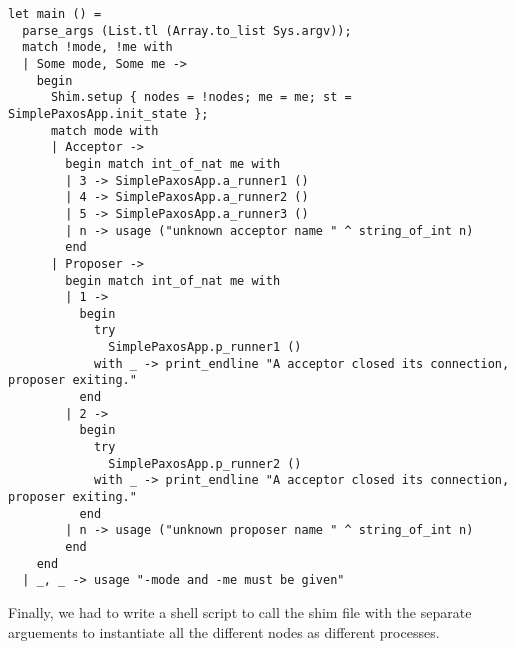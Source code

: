 \begin{lstlisting}
let main () =
  parse_args (List.tl (Array.to_list Sys.argv));
  match !mode, !me with
  | Some mode, Some me ->
    begin
      Shim.setup { nodes = !nodes; me = me; st = SimplePaxosApp.init_state };
      match mode with
      | Acceptor ->
        begin match int_of_nat me with
        | 3 -> SimplePaxosApp.a_runner1 ()
        | 4 -> SimplePaxosApp.a_runner2 ()
        | 5 -> SimplePaxosApp.a_runner3 ()
        | n -> usage ("unknown acceptor name " ^ string_of_int n)
        end
      | Proposer ->
        begin match int_of_nat me with
        | 1 ->
          begin
            try
              SimplePaxosApp.p_runner1 ()
            with _ -> print_endline "A acceptor closed its connection, proposer exiting."
          end
        | 2 ->
          begin
            try
              SimplePaxosApp.p_runner2 ()
            with _ -> print_endline "A acceptor closed its connection, proposer exiting."
          end
        | n -> usage ("unknown proposer name " ^ string_of_int n)
        end
    end
  | _, _ -> usage "-mode and -me must be given"
\end{lstlisting}

Finally, we had to write a shell script to call the shim file with the separate
arguements to instantiate all the different nodes as different processes.
